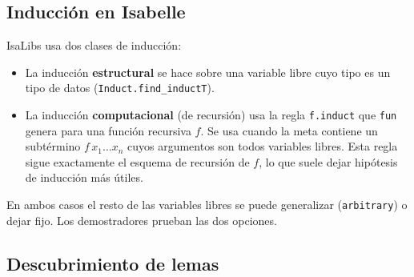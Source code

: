 \documentclass[11pt,a4paper]{article}
\newcommand{\isa}[1]{\texttt{#1}}
\theoremstyle{definition}
\theoremstyle{remark}
\begin{document}
\subsection{Inducción en Isabelle}

IsaLibs usa dos clases de inducción:
\begin{itemize}[nosep]
  \item La inducción \textbf{estructural} se hace sobre una variable libre cuyo
        tipo es un tipo de datos (\isa{Induct.find\_inductT}).
  \item La inducción \textbf{computacional} (de recursión) usa la regla
        \isa{f.induct} que \isa{fun} genera para una función recursiva $f$. Se usa cuando la meta
        contiene un subtérmino $f\,x_1\ldots x_n$ cuyos argumentos son todos
        variables libres. Esta regla sigue exactamente el esquema de recursión de
        $f$, lo que suele dejar hipótesis de inducción más útiles.
\end{itemize}
En ambos casos el resto de las variables libres se puede generalizar
(\isa{arbitrary}) o dejar fijo. Los demostradores prueban las dos opciones.

\subsection{Descubrimiento de lemas}
\label{sec:criticos}
\end{document}
